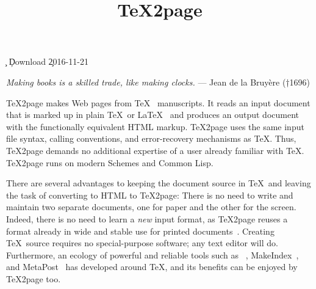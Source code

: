 %




\ifx\TZPtitle\UnDeFiNeD
\def\TZPtitle{TeX2page}\fi

\title{\TeX2page}

\smallskip

\c{}
%
\ifx\inpltdist\Undefined
\ifx\shipout\UnDeFiNeD
\c{Download
}
\else
\c{2016-11-21} %
\fi
\fi
%


\ifx\shipout\UnDeFiNeD
\centerline{}
\fi

{\obeylines\raggedleft
\ifx\shipout\UnDeFiNeD\small\else\eightfont\fi
{\it Making books is a skilled trade,
like making clocks.}
— Jean de la Bruyère (†1696)
}


\medskip


\n
\TeX2page
makes Web pages
from \TeX~\cite{tex} manuscripts.
It reads an
input document that is marked up in
plain \TeX\ or \LaTeX~\cite{latex}
and
produces an output document with the functionally
equivalent HTML markup.
\TeX2page uses the same input
file syntax, calling conventions, and  error-recovery
mechanisms as \TeX.  Thus, \TeX2page demands no additional
expertise of a user already familiar with \TeX.
\TeX2page runs on modern Schemes and Common Lisp.

There are several advantages to keeping the document
source in \TeX\ and leaving the task of converting to
HTML to \TeX2page:  There is no need to write and
maintain two separate documents, one for paper and the
other for the screen.  Indeed, there is no need to
learn a {\em new} input format, as \TeX2page reuses a
format already in wide and stable use for printed
documents~\cite{tug,ctan}.  Creating \TeX\
source requires no special-purpose software; any text
editor will do.  Furthermore, an ecology of powerful and
reliable tools such as \BibTeX~\cite{bibtex},
MakeIndex~\cite{makeindex}, and
MetaPost~\cite{metapost} has developed around \TeX, and
its benefits can be enjoyed by \TeX2page too.

